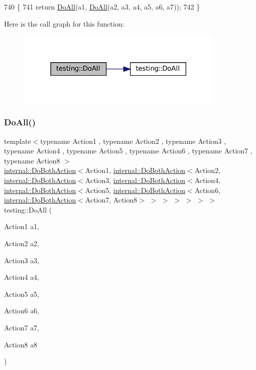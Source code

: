 \begin{DoxyCode}
740                 \{
741   \textcolor{keywordflow}{return} \hyperlink{namespacetesting_a79ac222c485c7aa0a1774bee17dadb10}{DoAll}(a1, \hyperlink{namespacetesting_a79ac222c485c7aa0a1774bee17dadb10}{DoAll}(a2, a3, a4, a5, a6, a7));
742 \}
\end{DoxyCode}
Here is the call graph for this function\+:
\nopagebreak
\begin{figure}[H]
\begin{center}
\leavevmode
\includegraphics[width=282pt]{namespacetesting_aadfaf4eb9897dcabe067b1d882febc86_cgraph}
\end{center}
\end{figure}
\mbox{\label{namespacetesting_a2c0e69056a8e5bc4ddc2308ba0af5214}} 
\subsubsection{\texorpdfstring{Do\+All()}{DoAll()}\hspace{0.1cm}{\footnotesize\ttfamily [7/9]}}
{\footnotesize\ttfamily template$<$typename Action1 , typename Action2 , typename Action3 , typename Action4 , typename Action5 , typename Action6 , typename Action7 , typename Action8 $>$ \\
\hyperlink{classtesting_1_1internal_1_1DoBothAction}{internal\+::\+Do\+Both\+Action}$<$Action1, \hyperlink{classtesting_1_1internal_1_1DoBothAction}{internal\+::\+Do\+Both\+Action}$<$Action2, \hyperlink{classtesting_1_1internal_1_1DoBothAction}{internal\+::\+Do\+Both\+Action}$<$Action3, \hyperlink{classtesting_1_1internal_1_1DoBothAction}{internal\+::\+Do\+Both\+Action}$<$Action4, \hyperlink{classtesting_1_1internal_1_1DoBothAction}{internal\+::\+Do\+Both\+Action}$<$Action5, \hyperlink{classtesting_1_1internal_1_1DoBothAction}{internal\+::\+Do\+Both\+Action}$<$Action6, \hyperlink{classtesting_1_1internal_1_1DoBothAction}{internal\+::\+Do\+Both\+Action}$<$Action7, Action8$>$ $>$ $>$ $>$ $>$ $>$ $>$ testing\+::\+Do\+All (\begin{DoxyParamCaption}\item[{Action1}]{a1,  }\item[{Action2}]{a2,  }\item[{Action3}]{a3,  }\item[{Action4}]{a4,  }\item[{Action5}]{a5,  }\item[{Action6}]{a6,  }\item[{Action7}]{a7,  }\item[{Action8}]{a8 }\end{DoxyParamCaption})\hspace{0.3cm}{\ttfamily [inline]}}




